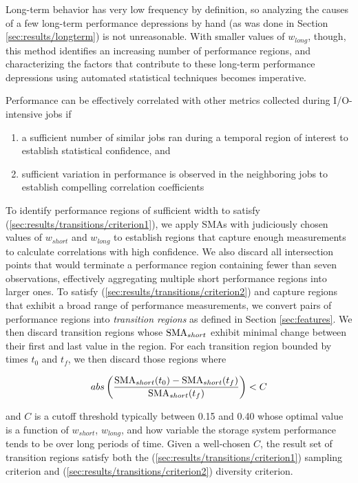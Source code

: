 Long-term behavior has very low frequency by definition, so analyzing the causes of a few long-term performance depressions by hand (as was done in Section \ref{sec:results/longterm}) is not unreasonable.
With smaller values of $w_{long}$, though, this method identifies an increasing number of performance regions, and characterizing the factors that contribute to these long-term performance depressions using automated statistical techniques becomes imperative.

Performance can be effectively correlated with other metrics collected during I/O-intensive jobs if

\begin{enumerate}[leftmargin=*]
\item a sufficient number of similar jobs ran during a temporal region of interest to establish statistical confidence, and \label{sec:results/transitions/criterion1}
\item sufficient variation in performance is observed in the neighboring jobs to establish compelling correlation coefficients \label{sec:results/transitions/criterion2}
\end{enumerate}

To identify performance regions of sufficient width to satisfy (\ref{sec:results/transitions/criterion1}), we apply SMAs with judiciously chosen values of $w_{short}$ and $w_{long}$ to establish regions that capture enough measurements to calculate correlations with high confidence.
We also discard all intersection points that would terminate a performance region containing fewer than seven observations, effectively aggregating multiple short performance regions into larger ones.
To satisfy (\ref{sec:results/transitions/criterion2}) and capture regions that exhibit a broad range of performance measurements, we convert pairs of performance regions into \emph{transition regions} as defined in Section \ref{sec:features}.
We then discard transition regions whose $\textup{SMA}_{short}$ exhibit minimal change between their first and last value in the region.  For each transition region bounded by times $t_0$ and $t_f$, we then discard those regions where

\begin{equation}
abs \left (
\frac
	{ \textup{SMA}_{short}(t_0) - \textup{SMA}_{short}(t_f) }
	{\textup{SMA}_{short}(t_f)}
\right ) < C
\end{equation}

and $C$ is a cutoff threshold typically between 0.15 and 0.40 whose optimal value is a function of $w_{short}$, $w_{long}$, and how variable the storage system performance tends to be over long periods of time.
Given a well-chosen $C$, the result set of transition regions satisfy both the (\ref{sec:results/transitions/criterion1}) sampling criterion and (\ref{sec:results/transitions/criterion2}) diversity criterion.

